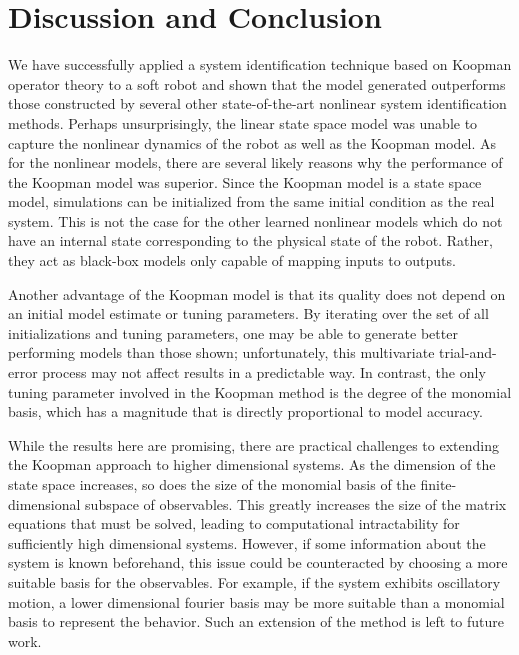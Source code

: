 \section{Discussion and Conclusion}
\label{sec:conclusion}

We have successfully applied a system identification technique based on Koopman operator theory to a soft robot and shown that the model generated outperforms those constructed by several other state-of-the-art nonlinear system identification methods.
Perhaps unsurprisingly, the linear state space model was unable to capture the nonlinear dynamics of the robot as well as the Koopman model.
As for the nonlinear models, there are several likely reasons why the performance of the Koopman model was superior.
Since the Koopman model is a state space model, simulations can be initialized from the same initial condition as the real system.
This is not the case for the other learned nonlinear models which do not have an internal state corresponding to the physical state of the robot.
Rather, they act as black-box models only capable of mapping inputs to outputs.

Another advantage of the Koopman model is that its quality does not depend on an initial model estimate or tuning parameters.
By iterating over the set of all initializations and tuning parameters, one may be able to generate better performing models than those shown; unfortunately, this multivariate trial-and-error process may not affect results in a predictable way.
In contrast, the only tuning parameter involved in the Koopman method is the degree of the monomial basis, which has a magnitude that is directly proportional to model accuracy. 

While the results here are promising, there are practical challenges to extending the Koopman approach to higher dimensional systems.
As the dimension of the state space increases, so does the size of the monomial basis of the finite-dimensional subspace of observables.
This greatly increases the size of the matrix equations that must be solved, leading to computational intractability for sufficiently high dimensional systems.
However, if some information about the system is known beforehand, this issue could be counteracted by choosing a more suitable basis for the observables.
For example, if the system exhibits oscillatory motion, a lower dimensional fourier basis may be more suitable than a monomial basis to represent the behavior.
Such an extension of the method is left to future work.

